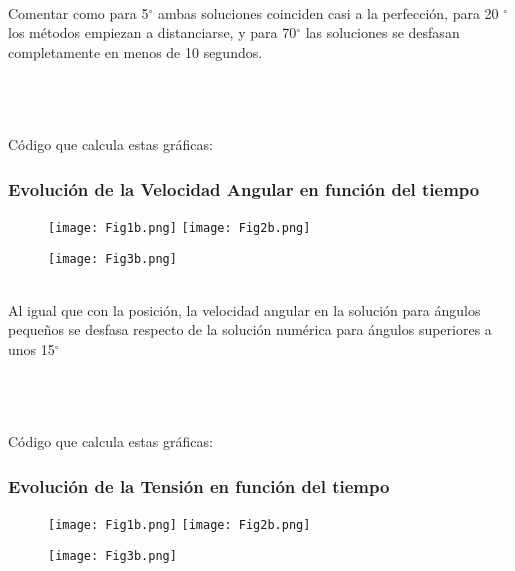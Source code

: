 \documentclass{article}
\begin{document}
\hfill \break \\
Comentar como para 5$^\circ$ ambas soluciones coinciden casi a la perfección, para 20 $^\circ$ los métodos empiezan a distanciarse, y para 70$^\circ$ las soluciones se desfasan completamente en menos de 10 segundos. 

\pagebreak
\hfill \break \\
\hfill \break \\
\hfill \break \\

Código que calcula estas gráficas:
\begin{adjustwidth}{-8pt}{-8pt}

\end{adjustwidth}
\pagebreak
\subsubsection{Evolución de la Velocidad Angular en función del tiempo}
\begin{figure}[h]
\centering
\hspace*{-2.3cm}
\texttt{[image: Fig1b.png]}\hfill
\texttt{[image: Fig2b.png]}
\hspace*{-2.3cm}
\end{figure}
\begin{figure}[h]
\centering
\texttt{[image: Fig3b.png]}
\end{figure}

\hfill \break \\
Al igual que con la posición, la velocidad angular en la solución para ángulos pequeños se desfasa respecto de la solución numérica para ángulos superiores a unos 15$^\circ$

\pagebreak
\hfill \break \\
\hfill \break \\
\hfill \break \\

Código que calcula estas gráficas:
\begin{adjustwidth}{-38pt}{-38pt}

\end{adjustwidth}
\pagebreak
\subsubsection{Evolución de la Tensión en función del tiempo}
\begin{figure}[h]
\centering
\hspace*{-2.3cm}
\texttt{[image: Fig1b.png]}\hfill
\texttt{[image: Fig2b.png]}
\hspace*{-2.3cm}
\end{figure}
\begin{figure}[h]
\centering
\texttt{[image: Fig3b.png]}
\end{figure}
\end{document}
